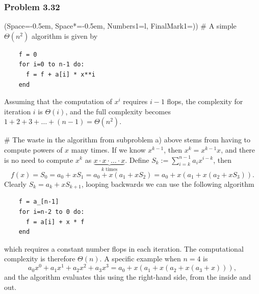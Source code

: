 \documentclass[12pt, a4paper]{article}
\newcommand{\listSpace}{-0.5em}%
\begin{document}
\subsubsection*{Problem 3.32}
\begin{easylist}[enumerate]
\ListProperties(Space=\listSpace, Space*=\listSpace, Numbers1=l, FinalMark1={)})
# A simple $\Theta(n^2)$ algorithm is given by
\begin{lstlisting}
    f = 0
    for i=0 to n-1 do:
      f = f + a[i] * x**i
    end
\end{lstlisting}
Assuming that the computation of $x^i$ requires $i-1$ flops, the complexity for iteration $i$ is $\Theta(i)$, and the full complexity becomes $1 + 2 + 3 + \dots + (n-1) = \Theta(n^2)$.

# The waste in the algorithm from subproblem a) above stems from having to compute powers of $x$ many times.
If we know $x^{k-1}$, then $x^k = x^{k-1} x$, and there is no need to compute $x^k$ as $\underbrace{x \cdot x \cdot \ldots \cdot x}_{k \text{ times}}$.
Define $S_k := \sum_{i=k}^{n-1} a_i x^{i-k}$, then
\begin{equation*}
	f(x) = S_0 = a_0 + x S_1 = a_0 + x\left( a_1 +x  S_2 \right) = a_0 + x\left( a_1 + x\left( a_2 + xS_3 \right) \right).
\end{equation*}
Clearly $S_k = a_k + x S_{k+1}$, looping backwards we can use the following algorithm
\begin{lstlisting}
    f = a_[n-1]
    for i=n-2 to 0 do:
      f = a[i] + x * f
    end
\end{lstlisting}
which requires a constant number flops in each iteration.
The computational complexity is therefore $\Theta(n)$.
A specific example when $n=4$ is
\begin{equation*}
	a_0 x^0 + a_1 x^1 +a_2 x^2 +a_3 x^3 = a_0 + x (a_1 + x (a_2 + x (a_3 + x))),
\end{equation*}
and the algorithm evaluates this using the right-hand side, from the inside and out.

\end{easylist}
\end{document}
